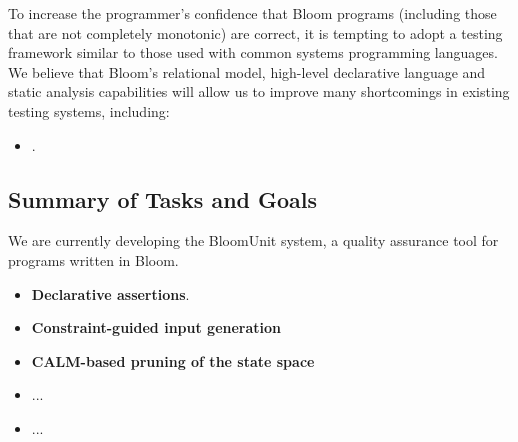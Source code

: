 To increase the programmer's confidence that Bloom programs (including those
that are not completely monotonic) are correct, 
it is tempting to adopt a testing framework similar to those used with common
systems programming languages.  We believe that Bloom's relational model,
high-level declarative language and static analysis capabilities will allow
us to improve many shortcomings in existing testing systems, including:

\begin{itemize}
\item \textbf{}.

\end{itemize}



\subsection{Summary of Tasks and Goals}

We are currently developing the BloomUnit system, a quality assurance tool
for programs written in Bloom.  

\begin{itemize}
\item \textbf{Declarative assertions}.
\item \textbf{Constraint-guided input generation}
\item \textbf{CALM-based pruning of the state space}
\item ...
\item ...
\end{itemize}

